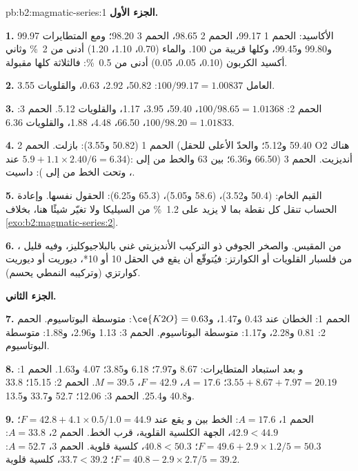 \begin{solution}{pb:b2:magmatic-series:1}
\noindent\textbf{الجزء الأول.}

\textbf{1.} الأكاسيد: الحمم 1 99.17، الحمم 2 98.65، الحمم 3 98.20؛ ومع المتطايرات
99.97 و99.80 و99.45، وكلها قريبة من 100. والماء (0.70، 1.10، 1.20) أدنى من
\qty{2}{\percent} وثاني أكسيد الكربون (0.10، 0.05، 0.05) أدنى من \qty{0.5}{\percent}: فالثلاثة
كلها مقبولة.

\textbf{2.} العامل $100/99.17 = 1.00837$:  50.82،  2.92، 
0.63، والقلويات 3.55.

\textbf{3.} الحمم 2: $100/98.65 = 1.01368$،  59.40،  3.95، 
1.17، والقلويات 5.12. الحمم 3: $100/98.20 = 1.01833$،  66.50،  4.48،
 1.88، والقلويات 6.36.

\textbf{4.} الحمم 1 (50.82 و3.55): بازلت. الحمم 2 (59.40 و5.12؛ والحدّ الأعلى للحقل O2
هناك عند $5.9 + 1.1\times2.40/6 = 6.34$): أنديزيت. الحمم 3 (66.50 و6.36؛ بين 63
والخط من  إلى ، وتحت الخط من  إلى ): داسيت.

\textbf{5.} القيم الخام: (50.4 و3.52)، (58.6 و5.05)، (65.3 و6.25): الحقول نفسها.
وإعادة الحساب تنقل كل نقطة بما لا يزيد على \qty{1.2}{\percent} من السيليكا ولا تغيّر
شيئًا هنا، بخلاف \cref{exo:b2:magmatic-series:2}.

\textbf{6.} ، من  المقيس. والصخر الجوفي ذو التركيب
الأنديزيتي غني بالبلاجيوكليز، وفيه قليل من فلسبار القلويات أو الكوارتز: فيُتوقّع أن
يقع في الحقل 10 أو 10*، ديوريت أو ديوريت كوارتزي (وتركيبه النمطي يحسم).

\noindent\textbf{الجزء الثاني.}

\textbf{7.} الحمم 1: الخطان عند 0.43 و1.47، و$\ce{K2O} = 0.63$: متوسطة البوتاسيوم. الحمم 2: 0.81
و2.28، و1.17: متوسطة البوتاسيوم. الحمم 3: 1.13 و2.96، و1.88: متوسطة البوتاسيوم.

\textbf{8.}  و بعد استبعاد المتطايرات: 8.67 و7.97؛ 6.18 و3.85؛ 4.07
و1.63. الحمم 1: $3.55 + 8.67 + 7.97 = 20.19$؛ $A = 17.6$، $F = 42.9$، $M = 39.5$.
الحمم 2: 15.15؛ 33.8 و40.8 و25.4. الحمم 3: 12.06؛ 52.7 و33.7 و13.5.

\textbf{9.} الحمم 1، $A = 17.6$: الخط بين  و يقع عند
$F = 42.8 + 4.1\times0.5/1.0 = 44.9$؛ $42.9 < 44.9$، الجهة الكلسية القلوية، قرب
الخط. الحمم 2، $A = 33.8$: $F = 49.6 + 2.9\times1.2/5 = 50.3$؛ $40.8 < 50.3$،
كلسية قلوية. الحمم 3، $A = 52.7$: $F = 40.8 - 2.9\times2.7/5 = 39.2$؛ $33.7 < 39.2$،
كلسية قلوية.


\end{solution}
